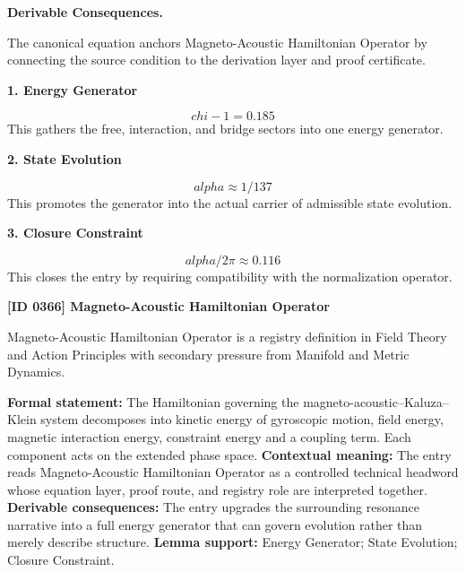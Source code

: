 \par\vspace{0.35em}
\noindent\textbf{Derivable Consequences.}\quad
\begingroup
\footnotesize
\raggedright
The canonical equation anchors Magneto-Acoustic Hamiltonian Operator by connecting the source condition to the derivation layer and proof certificate.
\par\endgroup

\noindent\textbf{1. Energy Generator}\par
\[
chi - 1 = 0.185
\]
\noindent This gathers the free, interaction, and bridge sectors into one energy generator.\par
\noindent\textbf{2. State Evolution}\par
\[
alpha \approx 1/137
\]
\noindent This promotes the generator into the actual carrier of admissible state evolution.\par
\noindent\textbf{3. Closure Constraint}\par
\[
alpha/2\pi \approx 0.116
\]
\noindent This closes the entry by requiring compatibility with the normalization operator.\par

\clearpage
\noindent\textbf{[ID 0366] Magneto-Acoustic Hamiltonian Operator}\par
\vspace{0.35em}
\begingroup\small
{}
Magneto-Acoustic Hamiltonian Operator is a registry definition in Field Theory and Action Principles with secondary pressure from Manifold and Metric Dynamics.

\begingroup\footnotesize\setlength{\emergencystretch}{3em}\sloppy
\textbf{Formal statement:} The Hamiltonian governing the magneto-acoustic--Kaluza--Klein system decomposes into kinetic energy of gyroscopic motion, field energy, magnetic interaction energy, constraint energy and a coupling term. Each component acts on the extended phase space. \textbf{Contextual meaning:} The entry reads Magneto-Acoustic Hamiltonian Operator as a controlled technical headword whose equation layer, proof route, and registry role are interpreted together. \textbf{Derivable consequences:} The entry upgrades the surrounding resonance narrative into a full energy generator that can govern evolution rather than merely describe structure. \textbf{Lemma support:} Energy Generator; State Evolution; Closure Constraint.\par
\endgroup

